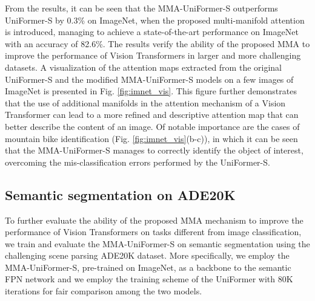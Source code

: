 \documentclass[10pt,twocolumn,letterpaper]{article}
\begin{document}
From the results, it can be seen that the MMA-UniFormer-S outperforms UniFormer-S by 0.3\% on ImageNet, when the proposed multi-manifold attention is introduced, managing to achieve a state-of-the-art performance on ImageNet with an accuracy of 82.6\%. The results verify the ability of the proposed MMA to improve the performance of Vision Transformers in larger and more challenging datasets. A visualization of the attention maps extracted from the original UniFormer-S and the modified MMA-UniFormer-S models on a few images of ImageNet is presented in Fig. \ref{fig:imnet_vis}. This figure further demonstrates that the use of additional manifolds in the attention mechanism of a Vision Transformer can lead to a more refined and descriptive attention map that can better describe the content of an image. Of notable importance are the cases of mountain bike identification (Fig. \ref{fig:imnet_vis}(b-c)), in which it can be seen that the MMA-UniFormer-S manages to correctly identify the object of interest, overcoming the mis-classification errors performed by the UniFormer-S.

\subsection{Semantic segmentation on ADE20K}

To further evaluate the ability of the proposed MMA mechanism to improve the performance of Vision Transformers on tasks different from image classification, we train and evaluate the MMA-UniFormer-S on semantic segmentation using the challenging scene parsing ADE20K dataset. More specifically, we employ the MMA-UniFormer-S, pre-trained on ImageNet, as a backbone to the semantic FPN network \cite{Author10} and we employ the training scheme of the UniFormer with 80K iterations for fair comparison among the two models. 
\end{document}
